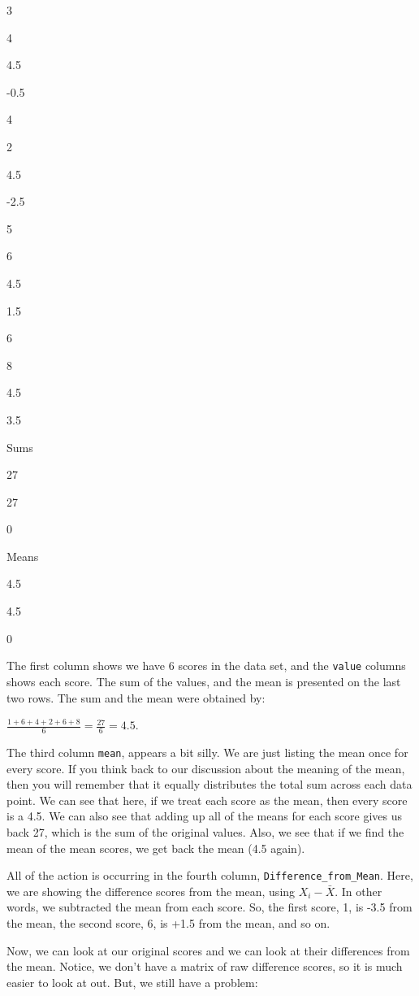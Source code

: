 \documentclass[]{book}
\begin{document}
3

4

4.5

-0.5

4

2

4.5

-2.5

5

6

4.5

1.5

6

8

4.5

3.5

Sums

27

27

0

Means

4.5

4.5

0

The first column shows we have 6 scores in the data set, and the \texttt{value} columns shows each score. The sum of the values, and the mean is presented on the last two rows. The sum and the mean were obtained by:

\(\frac{1+6+4+2+6+8}{6} = \frac{27}{6} = 4.5\).

The third column \texttt{mean}, appears a bit silly. We are just listing the mean once for every score. If you think back to our discussion about the meaning of the mean, then you will remember that it equally distributes the total sum across each data point. We can see that here, if we treat each score as the mean, then every score is a 4.5. We can also see that adding up all of the means for each score gives us back 27, which is the sum of the original values. Also, we see that if we find the mean of the mean scores, we get back the mean (4.5 again).

All of the action is occurring in the fourth column, \texttt{Difference\_from\_Mean}. Here, we are showing the difference scores from the mean, using \(X_{i}-\bar{X}\). In other words, we subtracted the mean from each score. So, the first score, 1, is -3.5 from the mean, the second score, 6, is +1.5 from the mean, and so on.

Now, we can look at our original scores and we can look at their differences from the mean. Notice, we don't have a matrix of raw difference scores, so it is much easier to look at out. But, we still have a problem:
\end{document}
